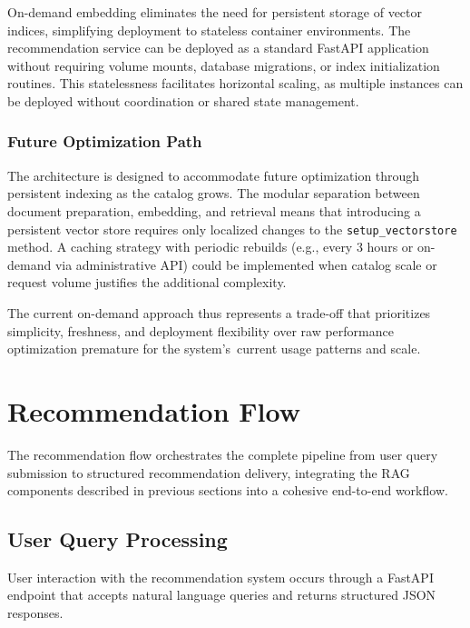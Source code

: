 On-demand embedding eliminates the need for persistent storage of vector indices, simplifying deployment to stateless container environments. The recommendation service can be deployed as a standard FastAPI application without requiring volume mounts, database migrations, or index initialization routines. This statelessness facilitates horizontal scaling, as multiple instances can be deployed without coordination or shared state management.

\subsubsection{Future Optimization Path}

The architecture is designed to accommodate future optimization through persistent indexing as the catalog grows. The modular separation between document preparation, embedding, and retrieval means that introducing a persistent vector store requires only localized changes to the \texttt{setup\_vectorstore} method. A caching strategy with periodic rebuilds (e.g., every 3 hours or on-demand via administrative API) could be implemented when catalog scale or request volume justifies the additional complexity.

The current on-demand approach thus represents a trade-off that prioritizes simplicity, freshness, and deployment flexibility over raw performance optimization premature for the system's~current usage patterns and scale.

\section{Recommendation Flow}

The recommendation flow orchestrates the complete pipeline from user query submission to structured recommendation delivery, integrating the RAG components described in previous sections into a cohesive end-to-end workflow.

\subsection{User Query Processing}

User interaction with the recommendation system occurs through a FastAPI endpoint that accepts natural language queries and returns structured JSON responses. %


